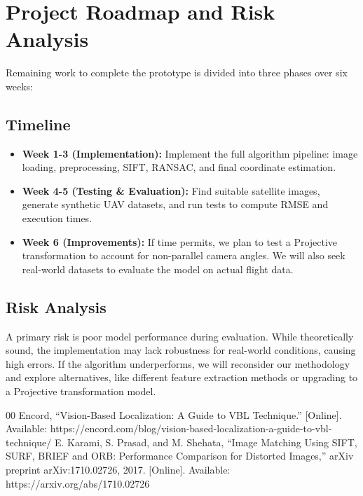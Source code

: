 \documentclass[conference]{IEEEtran}
\begin{document}
\section{Project Roadmap and Risk Analysis}
Remaining work to complete the prototype is divided into three phases over six weeks:

\subsection{Timeline}

\begin{itemize}
    \item \textbf{Week 1-3 (Implementation):} Implement the full algorithm pipeline: image loading, preprocessing, SIFT, RANSAC, and final coordinate estimation.
    \item \textbf{Week 4-5 (Testing \& Evaluation):} Find suitable satellite images, generate synthetic UAV datasets, and run tests to compute RMSE and execution times.
    \item \textbf{Week 6 (Improvements):} If time permits, we plan to test a Projective transformation to account for non-parallel camera angles. We will also seek real-world datasets to evaluate the model on actual flight data.
\end{itemize}

\subsection{Risk Analysis}
A primary risk is poor model performance during evaluation. While theoretically sound, the implementation may lack robustness for real-world conditions, causing high errors. If the algorithm underperforms, we will reconsider our methodology and explore alternatives, like different feature extraction methods or upgrading to a Projective transformation model.

\begin{thebibliography}{00}
 Encord, ``Vision-Based Localization: A Guide to VBL Technique.'' [Online]. Available: https://encord.com/blog/vision-based-localization-a-guide-to-vbl-technique/
 E. Karami, S. Prasad, and M. Shehata, ``Image Matching Using SIFT, SURF, BRIEF and ORB: Performance Comparison for Distorted Images,'' arXiv preprint arXiv:1710.02726, 2017. [Online]. Available: https://arxiv.org/abs/1710.02726
\end{thebibliography}
\end{document}
